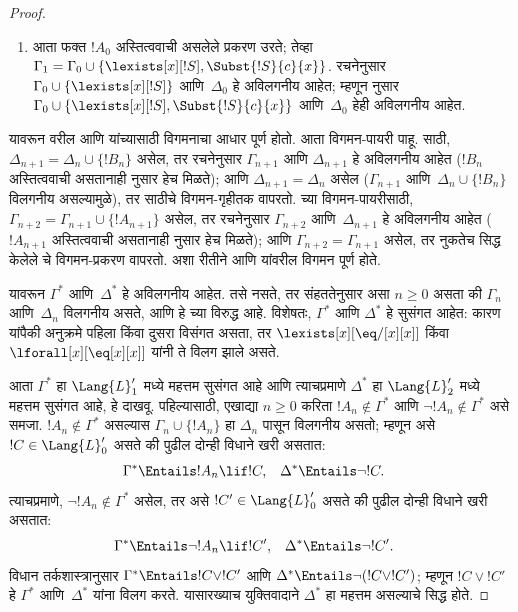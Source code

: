 \documentclass[../../../include/open-logic-section]{subfiles}
\begin{document}
\begin{proof}
\begin{enumerate}
  $\Gamma_1$ आणि~$\Delta_0$ हे अविलगनीय आहेत.
\item आता फक्त $!A_0$ अस्तित्ववाची असलेले प्रकरण उरते; तेव्हा
  $\Gamma_1 = \Gamma_0 \cup \{ \lexists[x][!S], \Subst{!S}{c}{x}
  \}$. रचनेनुसार $\Gamma_0 \cup \{ \lexists[x][!S]\}$ आणि~$\Delta_0$
  हे अविलगनीय आहेत; म्हणून  नुसार $\Gamma_0 \cup
  \{ \lexists[x][!S], \Subst{!S}{c}{x} \}$ आणि~$\Delta_0$ हेही
  अविलगनीय आहेत.
\end{enumerate}
यावरून वरील  आणि  यांच्यासाठी विगमनाचा आधार
पूर्ण होतो. आता विगमन-पायरी पाहू.  साठी, $\Delta_{n+1} =
\Delta_n \cup \{ !B_n \}$ असेल, तर रचनेनुसार $\Gamma_{n+1}$ आणि
$\Delta_{n+1}$ हे अविलगनीय आहेत ($!B_n$ अस्तित्ववाची असतानाही
 नुसार हेच मिळते); आणि $\Delta_{n+1} = \Delta_n$
असेल ($\Gamma_{n+1}$ आणि~$\Delta_n \cup \{!B_n\}$ विलगनीय असल्यामुळे),
तर  साठीचे विगमन-गृहीतक वापरतो.  च्या
विगमन-पायरीसाठी, $\Gamma_{n+2} = \Gamma_{n+1} \cup \{!A_{n+1} \}$
असेल, तर रचनेनुसार $\Gamma_{n+2}$ आणि~$\Delta_{n+1}$ हे अविलगनीय आहेत
($!A_{n+1}$ अस्तित्ववाची असतानाही  नुसार हेच
मिळते); आणि $\Gamma_{n+2} = \Gamma_{n+1}$ असेल, तर नुकतेच सिद्ध केलेले
 चे विगमन-प्रकरण वापरतो. अशा रीतीने  आणि
 यांवरील विगमन पूर्ण होते.

यावरून $\Gamma^*$ आणि~$\Delta^*$ हे अविलगनीय आहेत. तसे नसते, तर
संहततेनुसार असा $n \ge 0$ असता की $\Gamma_n$ आणि~$\Delta_n$ विलगनीय
असते, आणि हे  च्या विरुद्ध आहे. विशेषतः, $\Gamma^*$ आणि
$\Delta^*$ हे सुसंगत आहेत: कारण यांपैकी अनुक्रमे पहिला किंवा दुसरा विसंगत
असता, तर $\lexists[x][\eq/[x][x]]$ किंवा
$\lforall[x][\eq[x][x]]$ यांनी ते विलग झाले असते.

आता $\Gamma^*$ हा $\Lang{L}'_1$ मध्ये महत्तम सुसंगत आहे आणि त्याचप्रमाणे
$\Delta^*$ हा $\Lang{L}'_2$ मध्ये महत्तम सुसंगत आहे, हे दाखवू. पहिल्यासाठी,
एखाद्या $n \ge 0$ करिता $!A_n \notin \Gamma^*$ आणि $\lnot !A_n
\notin \Gamma^*$ असे समजा. $!A_n \notin \Gamma^*$ असल्यास $\Gamma_n
\cup \{!A_n \}$ हा $\Delta_n$ पासून विलगनीय असतो; म्हणून असे
$!C \in \Lang{L}'_0$ असते की पुढील दोन्ही विधाने खरी असतात:
\begin{align*}
  \Gamma^* & \Entails !A_n \lif !C, &
  \Delta^* & \Entails \lnot !C.
\end{align*}
त्याचप्रमाणे, $\lnot !A_n \notin \Gamma^*$ असेल, तर असे $!C' \in
\Lang{L}'_0$ असते की पुढील दोन्ही विधाने खरी असतात:
\begin{align*}
  \Gamma^* & \Entails \lnot !A_n \lif !C', &
  \Delta^* & \Entails \lnot !C'.
\end{align*}
विधान तर्कशास्त्रानुसार $\Gamma^* \Entails !C \lor !C'$ आणि
$\Delta^* \Entails \lnot (!C \lor !C')$; म्हणून $!C \lor !C'$ हे
$\Gamma^*$ आणि~$\Delta^*$ यांना विलग करते. यासारख्याच युक्तिवादाने
$\Delta^*$ हा महत्तम असल्याचे सिद्ध होते.


\end{proof}
\end{document}
